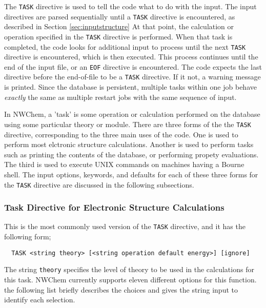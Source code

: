 The \verb+TASK+ directive is used to tell the code what to do with the input.
The input directives are parsed
sequentially until a \verb+TASK+ directive is encountered, as described
in Section \ref{sec:inputstructure}  At that
point, the calculation or operation specified in the \verb+TASK+ directive
is performed.  When that task is completed,
the code looks for additional input to process until the next
\verb+TASK+ directive is encountered, which is then executed.  This 
process continues until the end of the input file, or an \verb+EOF+
directive is encountered.  The code expects the last directive before the
end-of-file to be a \verb+TASK+ directive.  If it not, a warning message 
is printed.  Since the
database is persistent, multiple tasks within one job behave {\em
  exactly} the same as multiple restart jobs with the same sequence of
input.

In NWChem, a 'task' is some operation or calculation performed on the 
database using some particular theory or module.  There are three forms
of the the \verb+TASK+ directive, corresponding to the three main uses
of the code.  One is used to perform most elctronic structure calculations.
Another is used to perform tasks such as printing the contents of the
database, or performing propety evaluations.  The third is used to
execute UNIX commands on machines having a Bourne shell.  The input options,
keywords, and defaults for each of these three forms for the \verb+TASK+
directive are discussed in the following subsections.

\subsubsection{Task Directive for Electronic Structure Calculations}

This is the most commonly used version of the \verb+TASK+ directive, and
it has the following form;

\begin{verbatim}
  TASK <string theory> [<string operation default energy>] [ignore]
\end{verbatim}

The string \verb+theory+ specifies the level of theory to be used in the
calculations for this task.  NWChem currently supports eleven different
options for this function.  the following list briefly describes the
choices and gives the string input to identify each selection.

